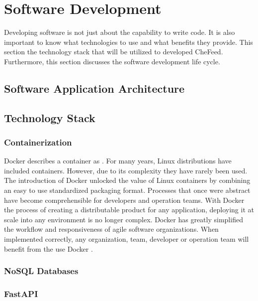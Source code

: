 \section{Software Development}
Developing software is not just about the capability to write code. It is also important to know what technologies to use and what benefits they provide. This section the technology stack that will be utilized to developed CheFeed. Furthermore, this section discusses the software development life cycle.

\subsection{Software Application Architecture}

\subsection{Technology Stack}

\subsubsection{Containerization}
    Docker describes a container as  \cite{docker_what_container}. For many years, Linux distributions have included containers. However, due to its complexity they have rarely been used. The introduction of Docker unlocked the value of Linux containers by combining an easy to use standardized packaging format. Processes that once were abstract have become comprehensible for developers and operation teams. With Docker the process of creating a distributable product for any application, deploying it at scale into any environment is no longer complex. Docker has greatly simplified the workflow and responsiveness of agile software organizations. When implemented correctly, any organization, team, developer or operation team will benefit from the use Docker \cite{matthias2015docker}.

\subsubsection{NoSQL Databases}

\subsubsection{FastAPI}

